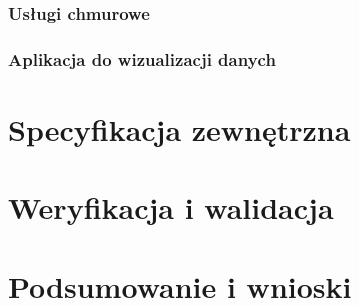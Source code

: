 \documentclass[a4paper, 12pt, twoside]{article}
\begin{document}
\subsubsection{Usługi chmurowe}

\subsubsection{Aplikacja do wizualizacji danych}


\section{Specyfikacja zewnętrzna}\label{spec-wew}

\section{Weryfikacja i walidacja}\label{testy}

\section{Podsumowanie i wnioski}\label{wnioski}

\printbibliography
\end{document}
